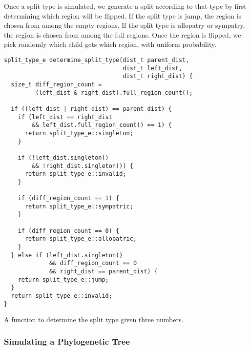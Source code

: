 \documentclass[a4paper]{article}
\begin{document}

Once a split type is simulated, we generate
a split according to that type by first determining which region will be
flipped\footnotemark.
If the split type is jump, the region is chosen from among the empty regions.
If the split type is allopatry or sympatry, the region is chosen from among the
full regions.
Once the region is flipped, we pick randomly which child gets which region,
with uniform probability.


\begin{listing}
	\begin{verbatim}
split_type_e determine_split_type(dist_t parent_dist, 
                                  dist_t left_dist, 
                                  dist_t right_dist) {
  size_t diff_region_count =
         (left_dist & right_dist).full_region_count();

  if ((left_dist | right_dist) == parent_dist) {
    if (left_dist == right_dist 
        && left_dist.full_region_count() == 1) {
      return split_type_e::singleton;
    }

    if (!left_dist.singleton() 
        && !right_dist.singleton()) {
      return split_type_e::invalid;
    }

    if (diff_region_count == 1) {
      return split_type_e::sympatric;
    }

    if (diff_region_count == 0) {
      return split_type_e::allopatric;
    }
  } else if (left_dist.singleton()
             && diff_region_count == 0
             && right_dist == parent_dist) {
    return split_type_e::jump;
  }
  return split_type_e::invalid;
}
\end{verbatim}
	\caption{A function to determine the split type given three numbers.}
	\label{lst:determine-split-type}
\end{listing}

\subsubsection{Simulating a Phylogenetic Tree}
\end{document}

